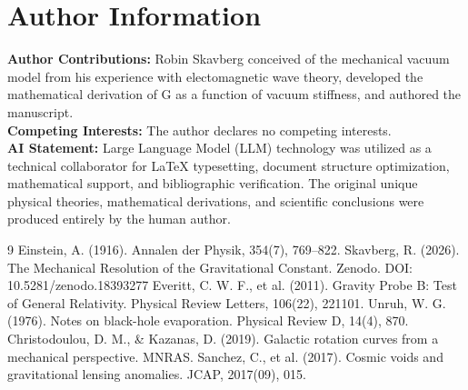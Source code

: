 \documentclass[12pt,a4paper]{article}
\begin{document}
\section*{Author Information}

\noindent \textbf{Author Contributions:} Robin Skavberg conceived of the mechanical vacuum model from his experience with electomagnetic wave theory, developed the mathematical derivation of G as a function of vacuum stiffness, and authored the manuscript. \\

\noindent \textbf{Competing Interests:} The author declares no competing interests. \\

\noindent \textbf{AI Statement:} Large Language Model (LLM) technology was utilized as a technical collaborator for LaTeX typesetting, document structure optimization, mathematical support, and bibliographic verification. The original unique physical theories, mathematical derivations, and scientific conclusions were produced entirely by the human author.

\begin{thebibliography}{9}
 Einstein, A. (1916). Annalen der Physik, 354(7), 769--822.
 Skavberg, R. (2026). The Mechanical Resolution of the Gravitational Constant. Zenodo. DOI: 10.5281/zenodo.18393277
 Everitt, C. W. F., et al. (2011). Gravity Probe B: Test of General Relativity. Physical Review Letters, 106(22), 221101.
 Unruh, W. G. (1976). Notes on black-hole evaporation. Physical Review D, 14(4), 870.
 Christodoulou, D. M., \& Kazanas, D. (2019). Galactic rotation curves from a mechanical perspective. MNRAS.
 Sanchez, C., et al. (2017). Cosmic voids and gravitational lensing anomalies. JCAP, 2017(09), 015.
\end{thebibliography}
\end{document}
